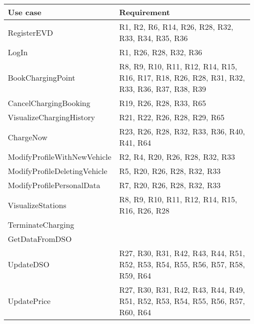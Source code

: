 \begin{center}
    \begin{longtable}[H]{|p{0.4\linewidth}|p{0.6\linewidth}|}
     \hline
     \textbf{Use case} & \textbf{Requirement}\\
     \hline
     RegisterEVD & R1, R2, R6, R14, R26, R28, R32, R33, R34, R35, R36 \\
     \hline
     LogIn & R1, R26, R28, R32, R36 \\
     \hline
     BookChargingPoint & R8, R9, R10, R11, R12, R14, R15, R16, R17, R18, R26, R28, R31, R32, R33, R36, R37, R38, R39 \\
     \hline
     CancelChargingBooking &  R19, R26, R28, R33, R65 \\
     \hline
     VisualizeChargingHistory & R21, R22, R26, R28, R29, R65 \\
     \hline
     ChargeNow & R23, R26, R28, R32, R33, R36, R40, R41, R64 \\
     \hline
     ModifyProfileWithNewVehicle & R2, R4, R20, R26, R28, R32, R33 \\
     \hline
     ModifyProfileDeletingVehicle & R5, R20, R26, R28, R32, R33 \\
     \hline
     ModifyProfilePersonalData & R7, R20, R26, R28, R32, R33 \\
     \hline
     VisualizeStations & R8, R9, R10, R11, R12, R14, R15, R16, R26, R28 \\
     \hline
     TerminateCharging & \\
     \hline
     GetDataFromDSO & \\
     \hline
     UpdateDSO & R27, R30, R31, R42, R43, R44, R51, R52, R53, R54, R55, R56, R57, R58, R59, R64 \\
     \hline
     UpdatePrice & R27, R30, R31, R42, R43, R44, R49, R51, R52, R53, R54, R55, R56, R57, R60, R64\\

\end{longtable}
\end{center}
